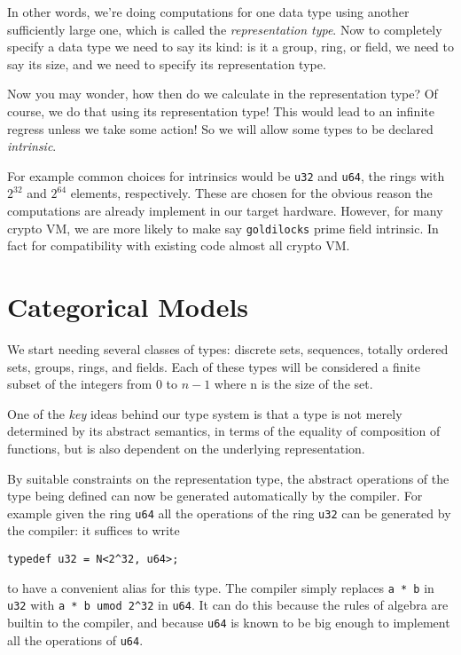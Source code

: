 In other words, we're doing computations for one data type using another sufficiently
large one, which is called the {\em representation type}. Now to completely specify
a data type we need to say its kind: is it a group, ring, or field, we need to say its
size, and we need to specify its representation type.

Now you may wonder, how then do we calculate in the representation type? Of course,
we do that using its representation type! This would lead to an infinite regress
unless we take some action! So we will allow some types to be declared {\em intrinsic}.

For example common choices for intrinsics would be \verb$u32$ and \verb$u64$,
the rings with $2^{32}$ and $2^{64}$ elements, respectively. These are chosen
for the obvious reason the computations are already implement in our target
hardware. However, for many crypto VM, we are more likely to make
say \verb$goldilocks$ prime field intrinsic. In fact for compatibility with
existing code almost all crypto VM.


\section{Categorical Models}
We start needing  several classes of types: discrete sets, sequences, totally ordered
sets, groups, rings, and fields.
Each of these types will be considered a finite subset of the integers 
from 0 to $n-1$ where n is the size of the set.

One of the {\em key} ideas behind our type system is that a type is not merely
determined by its abstract semantics, in terms of the equality of 
composition of functions, but is also dependent on the underlying representation.

By suitable constraints on the representation type, the abstract operations
of the type being defined can now be generated automatically by the compiler.
For example given the ring \verb$u64$ all the operations of the ring \verb$u32$
can be generated by the compiler: it suffices to write
\begin{verbatim}
typedef u32 = N<2^32, u64>;
\end{verbatim}
to have a convenient alias for this type. The compiler simply replaces \verb$a * b$ in
\verb$u32$ with \verb$a * b umod 2^32$ in \verb$u64$. It can do this because the rules
of algebra are builtin to the compiler, and because \verb$u64$ is known to be big enough
to implement all the operations of \verb$u64$.

